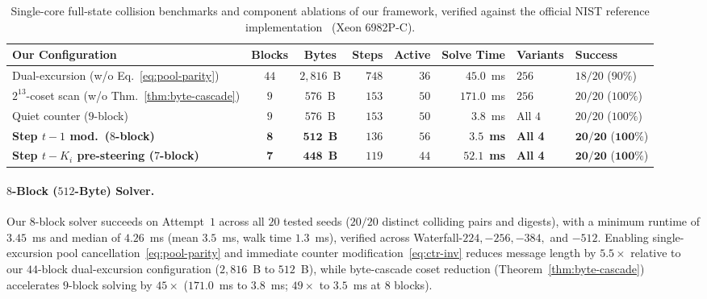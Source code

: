 \documentclass[11pt,a4paper]{article}
\theoremstyle{definition}
\theoremstyle{remark}
\begin{document}
\begin{table}[t]
\centering
\caption{Single-core full-state collision benchmarks and component ablations of our framework, verified against the official NIST reference implementation~\cite{Hat08} (Xeon 6982P-C).}
\label{tab:collision-bench}
\footnotesize
\setlength{\tabcolsep}{2.4pt}
\begin{tabular}{@{}lccrrrll@{}}
\toprule
\textbf{Our Configuration} & \textbf{Blocks} & \textbf{Bytes} & \textbf{Steps} & \textbf{Active} & \textbf{Solve Time} & \textbf{Variants} & \textbf{Success} \\
\midrule
Dual-excursion (w/o Eq.~\eqref{eq:pool-parity}) & $44$ & $2{,}816$~B & $748$ & $36$ & $45.0$~ms & $256$ & $18 / 20$ ($90\%$) \\
$2^{13}$-coset scan (w/o Thm.~\ref{thm:byte-cascade}) & $9$ & $576$~B & $153$ & $50$ & $171.0$~ms & $256$ & $20 / 20$ ($100\%$) \\
\midrule
Quiet counter ($9$-block) & $9$ & $576$~B & $153$ & $50$ & $3.8$~ms & All $4$ & $20 / 20$ ($100\%$) \\
\textbf{Step $t{-}1$ mod.\ ($8$-block)} & $\mathbf{8}$ & $\mathbf{512}$~\textbf{B} & $136$ & $56$ & $\mathbf{3.5}$~\textbf{ms} & \textbf{All 4} & $\mathbf{20 / 20}$ ($\mathbf{100\%}$) \\
\textbf{Step $t{-}K_i$ pre-steering ($7$-block)} & $\mathbf{7}$ & $\mathbf{448}$~\textbf{B} & $119$ & $44$ & $\mathbf{52.1}$~\textbf{ms} & \textbf{All 4} & $\mathbf{20 / 20}$ ($\mathbf{100\%}$) \\
\bottomrule
\end{tabular}
\end{table}

\paragraph{$8$-Block ($512$-Byte) Solver.}
Our $8$-block solver succeeds on Attempt~$1$ across all $20$ tested seeds ($20/20$ distinct colliding pairs and digests), with a minimum runtime of $3.45$~ms and median of $4.26$~ms (mean $3.5$~ms, walk time $1.3$~ms), verified across Waterfall-$224, -256, -384,$ and $-512$. Enabling single-excursion pool cancellation~\eqref{eq:pool-parity} and immediate counter modification~\eqref{eq:ctr-inv} reduces message length by $5.5\times$ relative to our $44$-block dual-excursion configuration ($2{,}816$~B to $512$~B), while byte-cascade coset reduction (Theorem~\ref{thm:byte-cascade}) accelerates $9$-block solving by $45\times$ ($171.0$~ms to $3.8$~ms; $49\times$ to $3.5$~ms at $8$ blocks).
\end{document}
